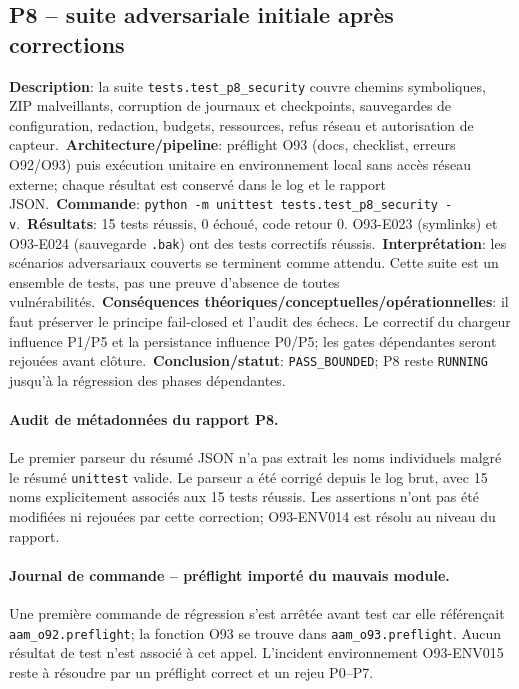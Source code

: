 \documentclass[11pt,a4paper,oneside]{report}
\begin{document}
\subsection{P8 -- suite adversariale initiale après corrections}
\textbf{Description}: la suite \texttt{tests.test\_p8\_security} couvre chemins symboliques, ZIP malveillants, corruption de journaux et checkpoints, sauvegardes de configuration, redaction, budgets, ressources, refus réseau et autorisation de capteur.\
\textbf{Architecture/pipeline}: préflight O93 (docs, checklist, erreurs O92/O93) puis exécution unitaire en environnement local sans accès réseau externe; chaque résultat est conservé dans le log et le rapport JSON.\
\textbf{Commande}: \texttt{python -m unittest tests.test\_p8\_security -v}.\
\textbf{Résultats}: 15 tests réussis, 0 échoué, code retour 0. O93-E023 (symlinks) et O93-E024 (sauvegarde \texttt{.bak}) ont des tests correctifs réussis.\
\textbf{Interprétation}: les scénarios adversariaux couverts se terminent comme attendu. Cette suite est un ensemble de tests, pas une preuve d'absence de toutes vulnérabilités.\
\textbf{Conséquences théoriques/conceptuelles/opérationnelles}: il faut préserver le principe fail-closed et l’audit des échecs. Le correctif du chargeur influence P1/P5 et la persistance influence P0/P5; les gates dépendantes seront rejouées avant clôture.\
\textbf{Conclusion/statut}: \texttt{PASS\_BOUNDED}; P8 reste \texttt{RUNNING} jusqu’à la régression des phases dépendantes.


\paragraph{Audit de métadonnées du rapport P8.}
Le premier parseur du résumé JSON n'a pas extrait les noms individuels malgré le résumé \texttt{unittest} valide. Le parseur a été corrigé depuis le log brut, avec 15 noms explicitement associés aux 15 tests réussis. Les assertions n'ont pas été modifiées ni rejouées par cette correction; O93-ENV014 est résolu au niveau du rapport.


\paragraph{Journal de commande -- préflight importé du mauvais module.}
Une première commande de régression s'est arrêtée avant test car elle référençait \texttt{aam\_o92.preflight}; la fonction O93 se trouve dans \texttt{aam\_o93.preflight}. Aucun résultat de test n'est associé à cet appel. L'incident environnement O93-ENV015 reste à résoudre par un préflight correct et un rejeu P0--P7.
\end{document}
